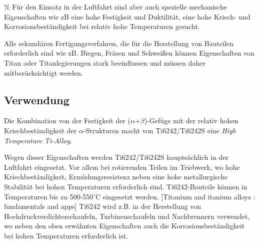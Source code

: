 \%	Für den Einsatz in der Luftfahrt sind aber auch spezielle mechanische  Eigenschaften wie zB eine hohe Festigkeit und Duktilität, eine hohe Kriech- und Korrosionsbeständigkeit bei relativ hohe Temperaturen gesucht.   

Alle sekundären Fertigungsverfahren, die für die Herstellung von Bauteilen erforderlich sind   wie zB. Biegen, Fräsen und Schweißen können Eigenschaften von Titan oder Titanlegierungen stark beeinflussen  und müssen daher mitberücksichtigt werden.




\subsection{Verwendung}


Die Kombination von der Festigkeit der ($\alpha$+$\beta$)-Gefüge mit der relativ hohen Kriechbeständigkeit der $\alpha$-Strukturen macht von Ti6242/Ti6242S eine \textit{High Temperature Ti-Alloy}.

Wegen dieser Eigenschaften werden Ti6242/Ti6242S hauptsächlich in der Luftfahrt eingesetzt. Vor allem bei rotierenden Teilen im Triebwerk, wo  hohe Kriechbeständigkeit, Ermüdungsresistenz  neben eine hohe metallurgische Stabilität bei hohen Temperaturen erforderlich sind. 
Ti6242-Bauteile können in Temperaturen bis zu 500-550$^\circ$C eingesetzt werden. [Titanium and itanium alloys : fundamentals and apps]
Ti6242 wird z.B. in der Herstellung von Hochdruckverdichterschaufeln, Turbinenschaufeln und Nachbrennern verwendet, wo neben den oben erwähnten Eigenschaften auch die Korrosionsbeständigkeit bei hohen Temperaturen erforderlich ist. \newline



